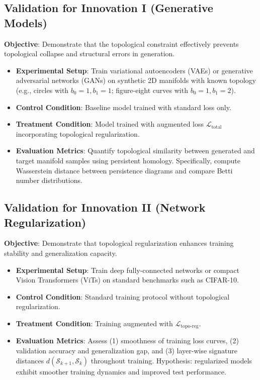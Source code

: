 \documentclass[10pt,leqno]{amsart}
\begin{document}
\subsection{Validation for Innovation I (Generative Models)}
\textbf{Objective}: Demonstrate that the topological constraint effectively prevents topological collapse and structural errors in generation.
\begin{itemize}
    \item \textbf{Experimental Setup}: Train variational autoencoders (VAEs) or generative adversarial networks (GANs) on synthetic 2D manifolds with known topology (e.g., circles with $b_0=1, b_1=1$; figure-eight curves with $b_0=1, b_1=2$).
    \item \textbf{Control Condition}: Baseline model trained with standard loss only.
    \item \textbf{Treatment Condition}: Model trained with augmented loss $\mathcal{L}_{\text{total}}$ incorporating topological regularization.
    \item \textbf{Evaluation Metrics}: Quantify topological similarity between generated and target manifold samples using persistent homology. Specifically, compute Wasserstein distance between persistence diagrams and compare Betti number distributions.
\end{itemize}

\subsection{Validation for Innovation II (Network Regularization)}
\textbf{Objective}: Demonstrate that topological regularization enhances training stability and generalization capacity.
\begin{itemize}
    \item \textbf{Experimental Setup}: Train deep fully-connected networks or compact Vision Transformers (ViTs) on standard benchmarks such as CIFAR-10.
    \item \textbf{Control Condition}: Standard training protocol without topological regularization.
    \item \textbf{Treatment Condition}: Training augmented with $\mathcal{L}_{\text{topo-reg}}$.
    \item \textbf{Evaluation Metrics}: Assess (1) smoothness of training loss curves, (2) validation accuracy and generalization gap, and (3) layer-wise signature distances $d(\mathcal{S}_{k+1},\mathcal{S}_k)$ throughout training. Hypothesis: regularized models exhibit smoother training dynamics and improved test performance.
\end{itemize}
\end{document}
